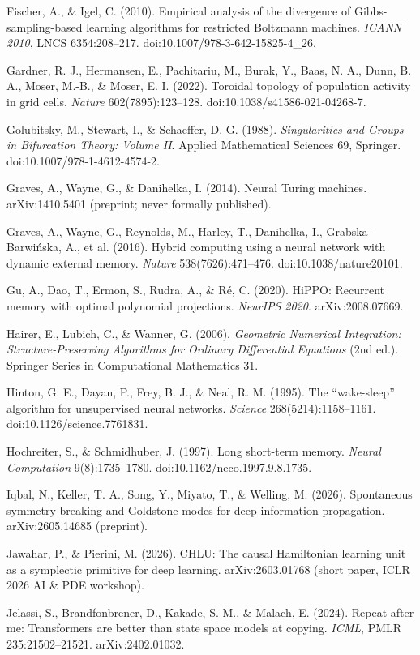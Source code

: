 \documentclass{article}
\begin{document}
{Fischer, A., \& Igel, C. (2010). Empirical analysis of the divergence of Gibbs-sampling-based learning algorithms for restricted Boltzmann machines. \emph{ICANN 2010}, LNCS 6354:208--217. doi:10.1007/978-3-642-15825-4\_26.\par
Gardner, R. J., Hermansen, E., Pachitariu, M., Burak, Y., Baas, N. A., Dunn, B. A., Moser, M.-B., \& Moser, E. I. (2022). Toroidal topology of population activity in grid cells. \emph{Nature} 602(7895):123--128. doi:10.1038/s41586-021-04268-7.\par
Golubitsky, M., Stewart, I., \& Schaeffer, D. G. (1988). \emph{Singularities and Groups in Bifurcation Theory: Volume II}. Applied Mathematical Sciences 69, Springer. doi:10.1007/978-1-4612-4574-2.\par
Graves, A., Wayne, G., \& Danihelka, I. (2014). Neural Turing machines. arXiv:1410.5401 (preprint; never formally published).\par
Graves, A., Wayne, G., Reynolds, M., Harley, T., Danihelka, I., Grabska-Barwi\'nska, A., et al. (2016). Hybrid computing using a neural network with dynamic external memory. \emph{Nature} 538(7626):471--476. doi:10.1038/nature20101.\par
Gu, A., Dao, T., Ermon, S., Rudra, A., \& R\'e, C. (2020). HiPPO: Recurrent memory with optimal polynomial projections. \emph{NeurIPS 2020}. arXiv:2008.07669.\par
Hairer, E., Lubich, C., \& Wanner, G. (2006). \emph{Geometric Numerical Integration: Structure-Preserving Algorithms for Ordinary Differential Equations} (2nd ed.). Springer Series in Computational Mathematics 31.\par
Hinton, G. E., Dayan, P., Frey, B. J., \& Neal, R. M. (1995). The ``wake-sleep'' algorithm for unsupervised neural networks. \emph{Science} 268(5214):1158--1161. doi:10.1126/science.7761831.\par
Hochreiter, S., \& Schmidhuber, J. (1997). Long short-term memory. \emph{Neural Computation} 9(8):1735--1780. doi:10.1162/neco.1997.9.8.1735.\par
Iqbal, N., Keller, T. A., Song, Y., Miyato, T., \& Welling, M. (2026). Spontaneous symmetry breaking and Goldstone modes for deep information propagation. arXiv:2605.14685 (preprint).\par
Jawahar, P., \& Pierini, M. (2026). CHLU: The causal Hamiltonian learning unit as a symplectic primitive for deep learning. arXiv:2603.01768 (short paper, ICLR 2026 AI \& PDE workshop).\par
Jelassi, S., Brandfonbrener, D., Kakade, S. M., \& Malach, E. (2024). Repeat after me: Transformers are better than state space models at copying. \emph{ICML}, PMLR 235:21502--21521. arXiv:2402.01032.\par
}
\end{document}
